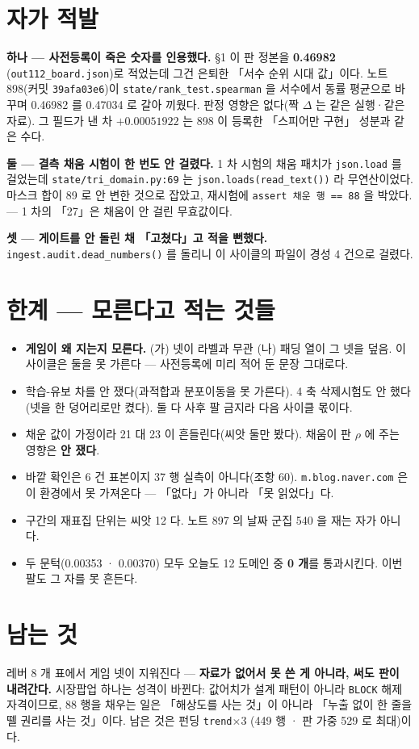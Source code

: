 \documentclass{article}
\begin{document}
\section{자가 적발}

\textbf{하나 --- 사전등록이 죽은 숫자를 인용했다.} §1 이 판 정본을 \textbf{0.46982}
(\texttt{out112\_board.json})로 적었는데 그건 은퇴한 「서수 순위 시대 값」이다.
노트 898(커밋 \texttt{39afa03e6})이 \texttt{state/rank\_test.spearman} 을 서수에서 동률 평균으로
바꾸며 0.46982 를 0.47034 로 갈아 끼웠다. 판정 영향은 없다(짝 $\Delta$ 는 같은 실행·같은 자료).
그 필드가 낸 차 $+0.00051922$ 는 898 이 등록한 「스피어만 구현」 성분과 같은 수다.

\textbf{둘 --- 결측 채움 시험이 한 번도 안 걸렸다.} 1 차 시험의 채움 패치가 \texttt{json.load} 를
걸었는데 \texttt{state/tri\_domain.py:69} 는 \texttt{json.loads(read\_text())} 라 무연산이었다.
마스크 합이 89 로 안 변한 것으로 잡았고, 재시험에 \texttt{assert 채운 행 == 88} 을 박았다.
 --- 1 차의 「27」은 채움이 안 걸린 무효값이다.

\textbf{셋 --- 게이트를 안 돌린 채 「고쳤다」고 적을 뻔했다.} \texttt{ingest.audit.dead\_numbers()}
를 돌리니 이 사이클의 파일이 경성 4 건으로 걸렸다.

\section{한계 --- 모른다고 적는 것들}

\begin{itemize}
\item \textbf{게임이 왜 지는지 모른다.} (가) 넷이 라벨과 무관 (나) 패딩 열이 그 넷을 덮음.
      이 사이클은 둘을 못 가른다 --- 사전등록에 미리 적어 둔 문장 그대로다.
\item 학습-유보 차를 안 쟀다(과적합과 분포이동을 못 가른다). 4 축 삭제시험도 안 했다
      (넷을 한 덩어리로만 켰다). 둘 다 사후 팔 금지라 다음 사이클 몫이다.
\item 채운 값이 가정이라 21 대 23 이 흔들린다(씨앗 둘만 봤다).
      채움이 판 $\rho$ 에 주는 영향은 \textbf{안 쟀다}.
\item 바깥 확인은 6 건 표본이지 37 행 실측이 아니다(조항 60).
      \texttt{m.blog.naver.com} 은 이 환경에서 못 가져온다 --- 「없다」가 아니라 「못 읽었다」다.
\item 구간의 재표집 단위는 씨앗 12 다. 노트 897 의 날짜 군집 540 을 재는 자가 아니다.
\item 두 문턱(0.00353 · 0.00370) 모두 오늘도 12 도메인 중 \textbf{0 개}를 통과시킨다.
      이번 팔도 그 자를 못 흔든다.
\end{itemize}

\section{남는 것}

레버 8 개 표에서 게임 넷이 지워진다 --- \textbf{자료가 없어서 못 쓴 게 아니라, 써도 판이 내려간다.}
시장팝업 하나는 성격이 바뀐다: 값어치가 설계 패턴이 아니라 \texttt{BLOCK} 해제 자격이므로,
88 행을 채우는 일은 「해상도를 사는 것」이 아니라 「누출 없이 한 줄을 뗄 권리를 사는 것」이다.
남은 것은 펀딩 \texttt{trend}$\times$3 (449 행 · 판 가중 529 로 최대)이다.
\end{document}
